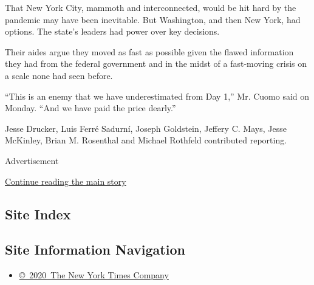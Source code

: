 That New York City, mammoth and interconnected, would be hit hard by the
pandemic may have been inevitable. But Washington, and then New York,
had options. The state's leaders had power over key decisions.

Their aides argue they moved as fast as possible given the flawed
information they had from the federal government and in the midst of a
fast-moving crisis on a scale none had seen before.

``This is an enemy that we have underestimated from Day 1,'' Mr. Cuomo
said on Monday. ``And we have paid the price dearly.''

Jesse Drucker, Luis Ferré Sadurní, Joseph Goldstein, Jeffery C. Mays,
Jesse McKinley, Brian M. Rosenthal and Michael Rothfeld contributed
reporting.

Advertisement

\protect\hyperlink{after-bottom}{Continue reading the main story}

\hypertarget{site-index}{%
\subsection{Site Index}\label{site-index}}

\hypertarget{site-information-navigation}{%
\subsection{Site Information
Navigation}\label{site-information-navigation}}

\begin{itemize}
\tightlist
\item
  \href{https://help.nytimes3xbfgragh.onion/hc/en-us/articles/115014792127-Copyright-notice}{©~2020~The
  New York Times Company}
\end{itemize}

